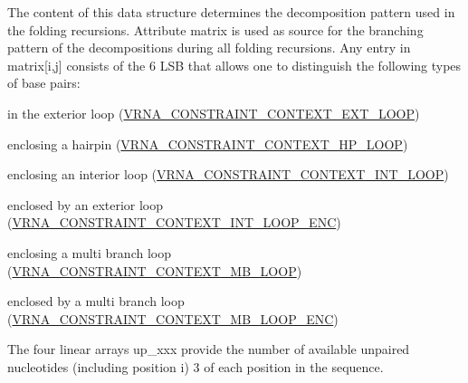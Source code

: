 The content of this data structure determines the decomposition pattern used in the folding recursions. Attribute \textquotesingle{}matrix\textquotesingle{} is used as source for the branching pattern of the decompositions during all folding recursions. Any entry in matrix\mbox{[}i,j\mbox{]} consists of the 6 L\+SB that allows one to distinguish the following types of base pairs\+:
\begin{DoxyItemize}
\item in the exterior loop (\hyperlink{group__hard__constraints_ga9418eda62a5dec070896702c279d2548}{V\+R\+N\+A\+\_\+\+C\+O\+N\+S\+T\+R\+A\+I\+N\+T\+\_\+\+C\+O\+N\+T\+E\+X\+T\+\_\+\+E\+X\+T\+\_\+\+L\+O\+OP})
\item enclosing a hairpin (\hyperlink{group__hard__constraints_ga79203702b197b6b9d3b78eed40663eb1}{V\+R\+N\+A\+\_\+\+C\+O\+N\+S\+T\+R\+A\+I\+N\+T\+\_\+\+C\+O\+N\+T\+E\+X\+T\+\_\+\+H\+P\+\_\+\+L\+O\+OP})
\item enclosing an interior loop (\hyperlink{group__hard__constraints_ga21feeab3a9e5fa5a9e3d9ac0fcf5994f}{V\+R\+N\+A\+\_\+\+C\+O\+N\+S\+T\+R\+A\+I\+N\+T\+\_\+\+C\+O\+N\+T\+E\+X\+T\+\_\+\+I\+N\+T\+\_\+\+L\+O\+OP})
\item enclosed by an exterior loop (\hyperlink{group__hard__constraints_ga0536288e04ff6332ecdc23ca4705402b}{V\+R\+N\+A\+\_\+\+C\+O\+N\+S\+T\+R\+A\+I\+N\+T\+\_\+\+C\+O\+N\+T\+E\+X\+T\+\_\+\+I\+N\+T\+\_\+\+L\+O\+O\+P\+\_\+\+E\+NC})
\item enclosing a multi branch loop (\hyperlink{group__hard__constraints_ga456ecd2ff00056bb64da8dd4f61bbfc5}{V\+R\+N\+A\+\_\+\+C\+O\+N\+S\+T\+R\+A\+I\+N\+T\+\_\+\+C\+O\+N\+T\+E\+X\+T\+\_\+\+M\+B\+\_\+\+L\+O\+OP})
\item enclosed by a multi branch loop (\hyperlink{group__hard__constraints_ga02a3d703ddbcfce393e4bbfcb9db7077}{V\+R\+N\+A\+\_\+\+C\+O\+N\+S\+T\+R\+A\+I\+N\+T\+\_\+\+C\+O\+N\+T\+E\+X\+T\+\_\+\+M\+B\+\_\+\+L\+O\+O\+P\+\_\+\+E\+NC})
\end{DoxyItemize}

The four linear arrays \textquotesingle{}up\+\_\+xxx\textquotesingle{} provide the number of available unpaired nucleotides (including position i) 3\textquotesingle{} of each position in the sequence.


